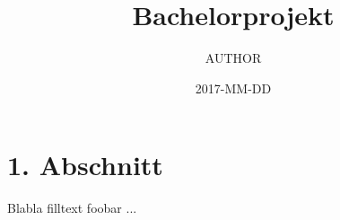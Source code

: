 \documentclass[a4paper,10pt]{article}
\title{Bachelorprojekt}
\date{2017-MM-DD}
\author{AUTHOR}
\begin{document}

  \newpage

  \tableofcontents
  \newpage


  \section{1. Abschnitt}
  Blabla filltext foobar \cite{wikipedia:foobar}... \\
  
\end{document}
